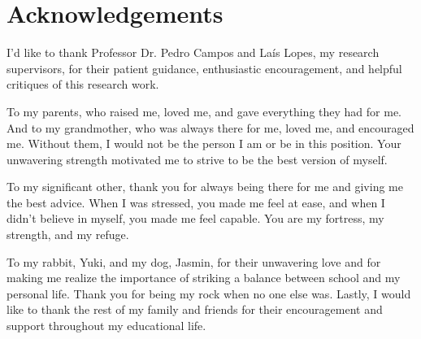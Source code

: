 \chapter*{Acknowledgements}

I'd like to thank Professor Dr. Pedro Campos and Laís Lopes, my research supervisors, for their patient guidance, enthusiastic encouragement, and helpful critiques of this research work. 

To my parents, who raised me, loved me, and gave everything they had for me. And to my grandmother, who was always there for me, loved me, and encouraged me. Without them, I would not be the person I am or be in this position. Your unwavering strength motivated me to strive to be the best version of myself.

To my significant other, thank you for always being there for me and giving me the best advice. When I was stressed, you made me feel at ease, and when I didn't believe in myself, you made me feel capable. You are my fortress, my strength, and my refuge.

To my rabbit, Yuki, and my dog, Jasmin, for their unwavering love and for making me realize the importance of striking a balance between school and my personal life. Thank you for being my rock when no one else was. Lastly, I would like to thank the rest of my family and friends for their encouragement and support throughout my educational life.